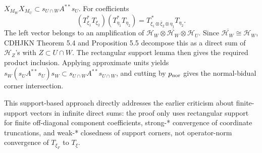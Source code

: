 \documentclass{article}
\begin{document}
\begin{itemize}
\(X_{M_W}X_{M_U}\subset s_{U\cap W}A^{**}s_U\).  For coefficients
\[
 (T_{\xi_1}^*T_{\xi_2})(T_{\eta_1}^*T_{\eta_2})
 =
 T_{\xi_1\otimes\bar\xi_2\otimes\eta_1}^{\,*}T_{\eta_2}.
\]
The left vector belongs to an amplification of
\(\mathcal H_W\otimes\overline{\mathcal H_W}\otimes\mathcal H_U\).  Since
\(\overline{\mathcal H_W}\cong\mathcal H_W\), CDHJKN Theorem 5.4 and
Proposition 5.5 decompose this as a direct sum of \(\mathcal H_Z\)'s with
\(Z\subset U\cap W\).  The rectangular support lemma then gives the required
product inclusion.  Applying approximate units yields
\(s_W(s_UA^{**}s_U)s_W\subset s_{U\cap W}A^{**}s_{U\cap W}\), and cutting by
\(p_{\rm nor}\) gives the normal-bidual corner intersection.
\end{itemize}

This support-based approach directly addresses the earlier criticism about
finite-support vectors in infinite direct sums: the proof only uses rectangular support for finite off-diagonal component coefficients, strong-*
convergence of coordinate truncations, and weak-* closedness of support corners,
not operator-norm convergence of \(T_{\xi_F}\) to \(T_\xi\).
\end{document}
